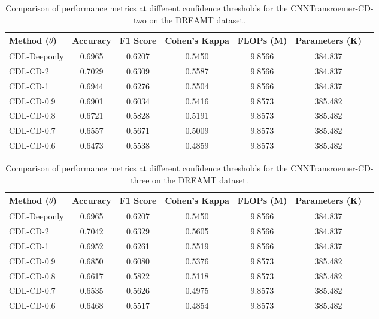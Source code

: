 \begin{table}[ht]
    \centering
    \begin{tabular}{lcccccc}
        \toprule
        Method (\(\theta\)) & Accuracy & F1 Score & Cohen's Kappa & FLOPs (M) & Parameters (K) \\
        \midrule
        CDL-Deeponly & 0.6965 & 0.6207 & 0.5450 & 9.8566 & 384.837\\
        CDL-CD-2 & 0.7029 & 0.6309 & 0.5587 & 9.8566 & 384.837\\
        CDL-CD-1 & 0.6944 & 0.6276 & 0.5504 & 9.8566 & 384.837\\
        CDL-CD-0.9 & 0.6901 & 0.6034 & 0.5416 & 9.8573 & 385.482 \\
        CDL-CD-0.8 & 0.6721 & 0.5828 & 0.5191 & 9.8573 & 385.482 \\
        CDL-CD-0.7 & 0.6557 & 0.5671 & 0.5009 & 9.8573 & 385.482 \\
        CDL-CD-0.6 & 0.6473 & 0.5538 & 0.4859 & 9.8573 & 385.482 \\
        \bottomrule
    \end{tabular}
    \caption{Comparison of performance metrics at different confidence thresholds for the CNNTransroemer-CD-two on the DREAMT dataset.}
    \label{tab:performance_of_different_confidence}
\end{table}

\begin{table}[ht]
    \centering
    \begin{tabular}{lcccccc}
        \toprule
        Method (\(\theta\)) & Accuracy & F1 Score & Cohen's Kappa & FLOPs (M) & Parameters (K) \\
        \midrule
        CDL-Deeponly & 0.6965 & 0.6207 & 0.5450 & 9.8566 & 384.837\\
        CDL-CD-2 & 0.7042 & 0.6329 & 0.5605 & 9.8566 & 384.837\\
        CDL-CD-1 & 0.6952 & 0.6261 & 0.5519 & 9.8566 & 384.837\\
        CDL-CD-0.9 & 0.6850 & 0.6080 & 0.5376 & 9.8573 & 385.482 \\
        CDL-CD-0.8 & 0.6617 & 0.5822 & 0.5118 & 9.8573 & 385.482 \\
        CDL-CD-0.7 & 0.6535 & 0.5626 & 0.4975 & 9.8573 & 385.482 \\
        CDL-CD-0.6 & 0.6468 & 0.5517 & 0.4854 & 9.8573 & 385.482 \\
        \bottomrule
    \end{tabular}
    \caption{Comparison of performance metrics at different confidence thresholds for the CNNTransroemer-CD-three on the DREAMT dataset.}
    \label{tab:performance_of_different_confidence}
\end{table}

